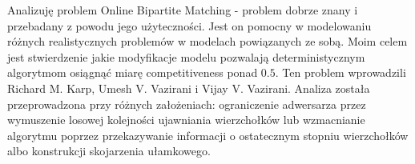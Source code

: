 Analizuję problem Online Bipartite Matching - problem dobrze znany i przebadany z powodu jego użyteczności. Jest on pomocny w modelowaniu różnych realistycznych problemów w modelach powiązanych ze sobą. Moim celem jest stwierdzenie jakie modyfikacje modelu pozwalają deterministycznym algorytmom osiągnąć miarę competitiveness ponad $0.5$. Ten problem wprowadzili Richard M. Karp, Umesh V. Vazirani i Vijay V. Vazirani. Analiza została przeprowadzona przy różnych założeniach: ograniczenie adwersarza przez wymuszenie losowej kolejności ujawniania wierzchołków lub wzmacnianie algorytmu poprzez przekazywanie informacji o ostatecznym stopniu wierzchołków albo konstrukcji skojarzenia ułamkowego.